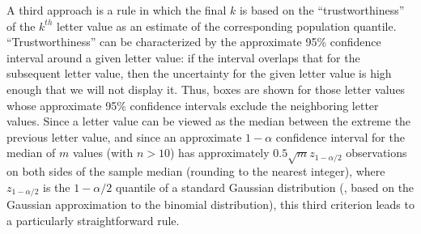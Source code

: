 \documentclass[oneside]{article}
\begin{document}
% 
% 
% 
% 

A third approach is a rule in which the final $k$ is based on 
the ``trustworthiness'' of the $k^{th}$ letter value as an 
estimate of the corresponding population quantile. 
``Trustworthiness'' can be characterized by the %
approximate 95\% confidence interval around a given letter value:
if the interval overlaps that for the subsequent letter value, then 
the uncertainty for the given letter value is high enough that we
will not display it.  Thus, boxes are shown for those
letter values whose approximate 95\% confidence intervals
exclude the neighboring letter values. 
Since a letter value can be viewed as the median between the
extreme the previous letter value, and since an approximate
$1-\alpha$ confidence interval for the median of $m$ values 
(with $n > 10$) has approximately $0.5 \sqrt{m} z_{1-\alpha/2}$ 
observations on both sides of the sample median (rounding to 
the nearest integer), where $z_{1-\alpha/2}$ is the 
${1-\alpha/2}$ quantile of a standard Gaussian distribution 
(\citet[161]{ha.order}, based on the Gaussian
approximation to the binomial distribution), this third
criterion leads to a particularly straightforward rule.
\end{document}
